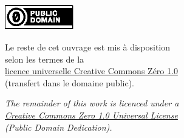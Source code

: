 \vfill



\begin{center}
\begin{minipage}{.6\textwidth}
\centering
\href{https://creativecommons.org/publicdomain/zero/1.0/deed.fr}{\includegraphics[width=3cm]{Back/cc-zero.eps}}

\bigskip
Le reste de cet ouvrage est mis à disposition\\selon les termes de la\\
\href{https://creativecommons.org/publicdomain/zero/1.0/deed.fr}{licence universelle Creative Commons Zéro 1.0}\\(transfert dans le domaine public).

\medskip
\textit{The remainder of this work is licenced under a\\
\href{https://creativecommons.org/publicdomain/zero/1.0}{Creative Commons Zero 1.0 Universal License}\\(Public Domain Dedication).}
\end{minipage}
\end{center}

